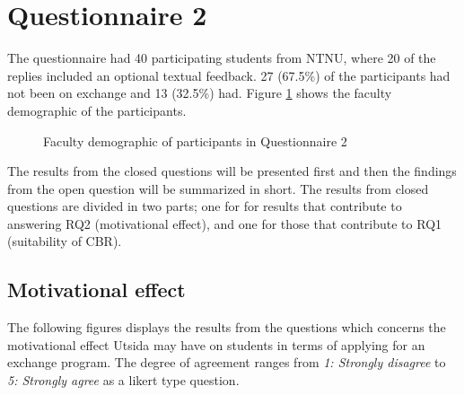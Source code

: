 \section{Questionnaire 2}
The questionnaire had 40 participating students from NTNU, where 20 of the replies included an optional textual feedback. 27 (67.5\%) of the participants had not been on exchange and 13 (32.5\%) had. Figure \ref{fig:faculty_demographic} shows the faculty demographic of the participants.

\begin{figure}[h]
    \small
    \centering
    \caption{Faculty demographic of participants in Questionnaire 2}
    \label{fig:faculty_demographic}
\end{figure}

The results from the closed questions will be presented first and then the findings from the open question will be summarized in short. The results from closed questions are divided in two parts; one for for results that contribute to answering RQ2 (motivational effect), and one for those that contribute to RQ1 (suitability of CBR).

\subsection{Motivational effect}

The following figures displays the results from the questions which concerns the motivational effect Utsida may have on students in terms of applying for an exchange program. The degree of agreement ranges from \textit{1: Strongly disagree} to \textit{5: Strongly agree} as a likert type question.


